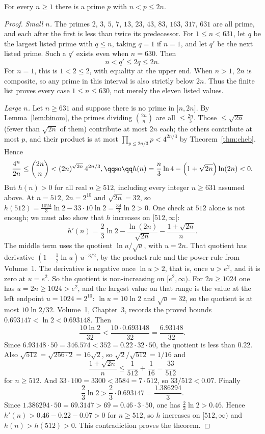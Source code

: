 \begin{theorem}\label{thm:bertrand}
For every $n\ge1$ there is a prime $p$ with $n<p\le2n$.
\end{theorem}
\begin{proof}
\emph{Small $n$.} The primes $2$, $3$, $5$, $7$, $13$, $23$, $43$, $83$, $163$, $317$, $631$ are all prime, and each after the first is less than twice its predecessor. For $1\le n<631$, let $q$ be the largest listed prime with $q\le n$, taking $q=1$ if $n=1$, and let $q'$ be the next listed prime. Such a $q'$ exists even when $n=630$. Then
\[
n<q'\le2q\le2n.
\]
For $n=1$, this is $1<2\le2$, with equality at the upper end. When $n>1$, $2n$ is composite, so any prime in this interval is also strictly below $2n$. Thus the finite list proves every case $1\le n\le630$, not merely the eleven listed values.

\emph{Large $n$.} Let $n\ge631$ and suppose there is no prime in $]n,2n]$. By Lemma~\ref{lem:binom}, the primes dividing $\binom{2n}n$ are all $\le\frac{2n}3$. Those $\le\sqrt{2n}$ (fewer than $\sqrt{2n}$ of them) contribute at most $2n$ each; the others contribute at most $p$, and their product is at most $\prod_{p\le2n/3}p<4^{2n/3}$ by Theorem~\ref{thm:cheb}. Hence
\[
\begin{gathered}\frac{4^n}{2n}\le\binom{2n}n<(2n)^{\sqrt{2n}}\,4^{2n/3},\qq\text{so}\qq h(n)=\frac n3\ln4-\left(1+\sqrt{2n}\right)\ln(2n)<0.\end{gathered}
\]
But $h(n)>0$ for all real $n\ge512$, including every integer $n\ge631$ assumed above. At $n=512$, $2n=2^{10}$ and $\sqrt{2n}=32$, so $h(512)=\frac{1024}3\ln2-33\cdot10\ln2=\frac{34}3\ln2>0$. One check at $512$ alone is not enough; we must also show that $h$ increases on $[512,\infty[$:
\[
h'(n)=\frac23\ln2-\frac{\ln(2n)}{\sqrt{2n}}-\frac{1+\sqrt{2n}}n.
\]
The middle term uses the quotient $\ln u/\sqrt u$, with $u=2n$. That quotient has derivative $(1-\frac12\ln u)\,u^{-3/2}$, by the product rule and the power rule from Volume~1. The derivative is negative once $\ln u>2$, that is, once $u>e^2$, and it is zero at $u=e^2$. So the quotient is non-increasing on $[e^2,\infty)$. For $2n\ge1024$ one has $u=2n\ge1024>e^2$, and the largest value on that range is the value at the left endpoint $u=1024=2^{10}$: $\ln u=10\ln2$ and $\sqrt u=32$, so the quotient is at most $10\ln2/32$. Volume~1, Chapter~3, records the proved bounds $0.693147<\ln2<0.693148$. Then
\[
\frac{10\ln2}{32}<\frac{10\cdot0.693148}{32}=\frac{6.93148}{32}.
\]
Since $6.93148\cdot50=346.574<352=0.22\cdot32\cdot50$, the quotient is less than $0.22$. Also $\sqrt{512}=\sqrt{256\cdot2}=16\sqrt2$, so $\sqrt2/\sqrt{512}=1/16$ and
\[
\frac{1+\sqrt{2n}}n\le\frac1{512}+\frac1{16}=\frac{33}{512}
\]
for $n\ge512$. And $33\cdot100=3300<3584=7\cdot512$, so $33/512<0.07$. Finally
\[
\frac23\ln2>\frac23\cdot0.693147=\frac{1.386294}{3}.
\]
Since $1.386294\cdot50=69.3147>69=0.46\cdot3\cdot50$, one has $\frac23\ln2>0.46$. Hence $h'(n)>0.46-0.22-0.07>0$ for $n\ge512$, so $h$ increases on $[512,\infty)$ and $h(n)>h(512)>0$. This contradiction proves the theorem.
\end{proof}

